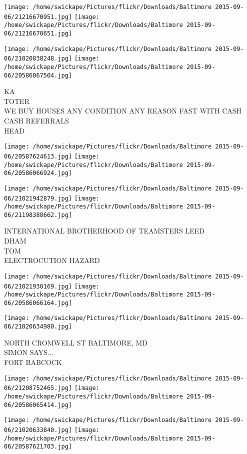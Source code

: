 \documentclass[10pt,letterpaper]{article}
\begin{document}
\texttt{[image: /home/swickape/Pictures/flickr/Downloads/Baltimore 2015-09-06/21216670951.jpg]}
\texttt{[image: /home/swickape/Pictures/flickr/Downloads/Baltimore 2015-09-06/21216670651.jpg]}

\texttt{[image: /home/swickape/Pictures/flickr/Downloads/Baltimore 2015-09-06/21020838248.jpg]}
\texttt{[image: /home/swickape/Pictures/flickr/Downloads/Baltimore 2015-09-06/20586067504.jpg]}

KA\\
TOTER\\
WE BUY HOUSES ANY CONDITION ANY REASON FAST WITH CASH CASH REFERRALS\\
HEAD
\pagebreak

\texttt{[image: /home/swickape/Pictures/flickr/Downloads/Baltimore 2015-09-06/20587624613.jpg]}
\texttt{[image: /home/swickape/Pictures/flickr/Downloads/Baltimore 2015-09-06/20586066924.jpg]}

\texttt{[image: /home/swickape/Pictures/flickr/Downloads/Baltimore 2015-09-06/21021942879.jpg]}
\texttt{[image: /home/swickape/Pictures/flickr/Downloads/Baltimore 2015-09-06/21198388662.jpg]}

INTERNATIONAL BROTHERHOOD OF TEAMSTERS LEED\\
DHAM\\
TOM\\
ELECTROCUTION HAZARD
\pagebreak

\texttt{[image: /home/swickape/Pictures/flickr/Downloads/Baltimore 2015-09-06/21021930169.jpg]}
\texttt{[image: /home/swickape/Pictures/flickr/Downloads/Baltimore 2015-09-06/20586066164.jpg]}

\vspace{0.25in}
\texttt{[image: /home/swickape/Pictures/flickr/Downloads/Baltimore 2015-09-06/21020634980.jpg]}

NORTH CROMWELL ST BALTIMORE, MD\\
SIMON SAYS...\\
FORT BABCOCK
\pagebreak

\texttt{[image: /home/swickape/Pictures/flickr/Downloads/Baltimore 2015-09-06/21208752465.jpg]}
\texttt{[image: /home/swickape/Pictures/flickr/Downloads/Baltimore 2015-09-06/20586065414.jpg]}

\texttt{[image: /home/swickape/Pictures/flickr/Downloads/Baltimore 2015-09-06/21020633840.jpg]}
\texttt{[image: /home/swickape/Pictures/flickr/Downloads/Baltimore 2015-09-06/20587621703.jpg]}
\end{document}
